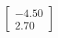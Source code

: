 \documentclass[preview]{standalone}
\begin{document}
\begin{align*}
\begin{bmatrix} -4.50 \\ 2.70 \end{bmatrix}
\end{align*}
\end{document}
